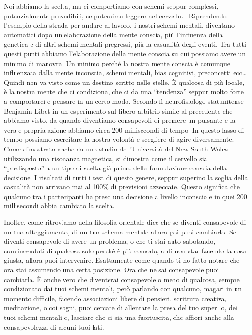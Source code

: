 \documentclass[12pt]{book} %
\begin{document}
Noi abbiamo la scelta, ma ci comportiamo con schemi seppur complessi, potenzialmente prevedibili, se potessimo leggere
nel cervello. \ Riprendendo l'esempio della strada per andare al lavoro, i nostri schemi mentali,
diventano automatici dopo un'elaborazione della mente conscia, più
l'influenza della genetica e di altri schemi mentali pregressi, più la casualità degli eventi. Tra
tutti questi punti abbiamo l'elaborazione della mente conscia su cui possiamo avere un minimo di
manovra. Un minimo perché la nostra mente conscia è comunque influenzata dalla mente inconscia, schemi mentali, bias
cognitivi, preconcetti ecc… Quindi non va visto come un destino scritto nelle stelle. È qualcosa di più locale, è la
nostra mente che ci condiziona, che ci da una “tendenza” seppur molto forte a comportarci e pensare in un certo modo.
Secondo il neurofisiologo statunitense Benjamin Libet in un esperimento sul libero arbitrio simile al precedente che
abbiamo visto, da quando diventiamo consapevoli di
premere un pulsante e la vera e propria azione abbiamo circa 200 millisecondi di tempo. In questo lasso di tempo
possiamo esercitare la nostra volontà e scegliere di agire
diversamente. Come dimostrato anche
da uno studio dell'Università del New South Wales
utilizzando una risonanza magnetica, si dimostra come il cervello sia “predisposto” a un tipo di scelta già prima della
formulazione conscia della decisione. I risultati di tutti i test di questo genere, seppur superino la soglia della
casualità non arrivano mai al 100\% di previsioni azzeccate. Questo significa che qualcuno tra i partecipanti ha preso
una decisione a livello inconscio e in quei 200 millisecondi abbia cambiato la
scelta.

Inoltre, come ritroviamo nella filosofia orientale dice che se diventi consapevole di un tuo atteggiamento, di un tuo
schema mentale allora poi puoi cambiarlo. Se diventi consapevole di avere un problema, o che ti stai auto sabotando,
convincendoti di qualcosa solo perché è più comodo, o di non star facendo la cosa giusta, allora puoi intervenire.
Esattamente come quando ti ho fatto notare che ora stai assumendo una certa posizione. Ora che ne sai consapevole puoi
cambiarla. È anche vero che diventerai consapevole o meno di qualcosa, sempre condizionato dai tuoi schemi mentali,
però parlando con qualcuno, magari in un momento difficile, facendo associazioni libere di pensieri, scrittura
creativa, meditazione, o coi sogni, puoi cercare di allentare la presa del tuo super io, dei tuoi schemi mentali e,
lasciare che ci sia una fuoriuscita, che affiori anche alla consapevolezza di alcuni tuoi lati.
\end{document}
